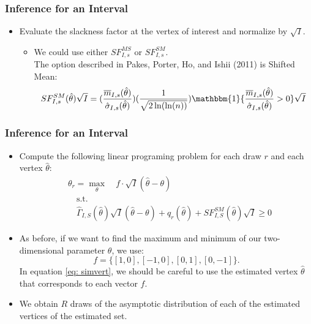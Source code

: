 \documentclass[10pt,letterpaper]{beamer}
\begin{document}
\begin{frame}
\frametitle{Inference for an Interval}

\begin{itemize}
	\item Evaluate the slackness factor at the vertex of interest and normalize by $\sqrt{I}$.
	\begin{itemize}
		\item We could use either $SF^{MS}_{I,s}$ or $SF^{SM}_{I,s}$.\\
		The option described in Pakes, Porter, Ho, and Ishii (2011) is Shifted Mean:
		\begin{equation*}
		SF^{SM}_{I,s}(\hat{\theta})\sqrt{I} =(\frac{\overline{m}_{I,s}(\hat{\theta})}{\hat{\sigma}_{I,s}(\hat{\theta})})(\frac{1}{\sqrt{2\ln(\ln (n))}})\mathbbm{1}\{\frac{\overline{m}_{I,s}(\hat{\theta})}{\hat{\sigma}_{I,s}(\hat{\theta})}>0\}\sqrt{I}
		\end{equation*}
	\end{itemize}
\end{itemize}
\end{frame}
\begin{frame}
\frametitle{Inference for an Interval}

\begin{itemize}
	\item Compute the following linear programing problem for each draw $r$ and each vertex $\hat{\theta}$:
	\begin{equation}
	\begin{split}
	&\theta_{r}=\max_{\theta}\quad f\cdot\sqrt{I}(\hat{\theta}-\theta)\\
	& \quad \text{s.t.}\\
	& \quad\widehat{\Gamma}_{I,S}(\hat{\theta})\sqrt{I}(\hat{\theta}-\theta)+q_{r}(\hat{\theta})+SF^{SM}_{I,S}(\hat{\theta})\sqrt{I}\geq 0
	\label{eq: simvert}
	\end{split}
	\end{equation}
	\item As before, if we want to find the maximum and minimum of our two-dimensional parameter $\theta$, we use:
	\begin{equation*}
	f=\{[1,0],[-1,0],[0,1],[0,-1]\}.
	\end{equation*}
	In equation \eqref{eq: simvert}, we should be careful to use the estimated vertex $\hat{\theta}$ that corresponds to each vector $f$.
	\item We obtain $R$ draws of the asymptotic distribution of each of the estimated vertices of the estimated set.
\end{itemize}
\end{frame}
\end{document}
